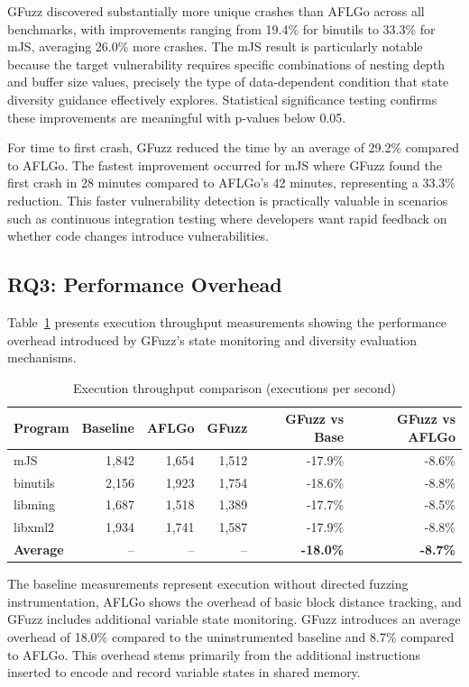 \documentclass[review]{elsarticle}
\begin{document}
GFuzz discovered substantially more unique crashes than AFLGo across all benchmarks, with improvements ranging from 19.4\% for binutils to 33.3\% for mJS, averaging 26.0\% more crashes. The mJS result is particularly notable because the target vulnerability requires specific combinations of nesting depth and buffer size values, precisely the type of data-dependent condition that state diversity guidance effectively explores. Statistical significance testing confirms these improvements are meaningful with p-values below 0.05.

For time to first crash, GFuzz reduced the time by an average of 29.2\% compared to AFLGo. The fastest improvement occurred for mJS where GFuzz found the first crash in 28 minutes compared to AFLGo's 42 minutes, representing a 33.3\% reduction. This faster vulnerability detection is practically valuable in scenarios such as continuous integration testing where developers want rapid feedback on whether code changes introduce vulnerabilities.

\subsection{RQ3: Performance Overhead}

Table~\ref{tab:overhead} presents execution throughput measurements showing the performance overhead introduced by GFuzz's state monitoring and diversity evaluation mechanisms.

\begin{table}[!htbp]
\centering
\caption{Execution throughput comparison (executions per second)}
\label{tab:overhead}
\begin{tabular}{lrrrrr}
\toprule
\textbf{Program} & \textbf{Baseline} & \textbf{AFLGo} & \textbf{GFuzz} & \textbf{GFuzz vs Base} & \textbf{GFuzz vs AFLGo} \\
\midrule
mJS & 1,842 & 1,654 & 1,512 & -17.9\% & -8.6\% \\
binutils & 2,156 & 1,923 & 1,754 & -18.6\% & -8.8\% \\
libming & 1,687 & 1,518 & 1,389 & -17.7\% & -8.5\% \\
libxml2 & 1,934 & 1,741 & 1,587 & -17.9\% & -8.8\% \\
\midrule
\textbf{Average} & -- & -- & -- & \textbf{-18.0\%} & \textbf{-8.7\%} \\
\bottomrule
\end{tabular}
\end{table}

The baseline measurements represent execution without directed fuzzing instrumentation, AFLGo shows the overhead of basic block distance tracking, and GFuzz includes additional variable state monitoring. GFuzz introduces an average overhead of 18.0\% compared to the uninstrumented baseline and 8.7\% compared to AFLGo. This overhead stems primarily from the additional instructions inserted to encode and record variable states in shared memory.
\end{document}
